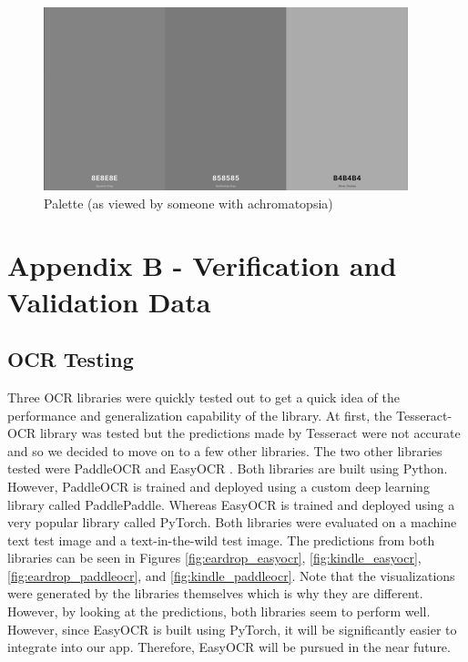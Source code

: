 \documentclass[a4paper,11pt]{article}
\begin{document}
\begin{figure}[H]
\centering
\includegraphics[scale=0.45]{img/Palette_Greyscale.png}
\caption{Palette (as viewed by someone with achromatopsia)}
\label{fig:palette_greyscale}
\end{figure}

\newpage
\section{Appendix B - Verification and Validation Data}

\subsection{OCR Testing}
Three OCR libraries were quickly tested out to get a quick idea of the performance and generalization capability of the library. At first, the Tesseract-OCR library \cite{tesseract-github} was tested but the predictions made by Tesseract were not accurate and so we decided to move on to a few other libraries. The two other libraries tested were PaddleOCR \cite{paddle-ocr} and EasyOCR \cite{easy-ocr}. Both libraries are built using Python. However, PaddleOCR is trained and deployed using a custom deep learning library called PaddlePaddle. Whereas EasyOCR is trained and deployed using a very popular library called PyTorch. Both libraries were evaluated on a machine text test image and a text-in-the-wild test image. The predictions from both libraries can be seen in Figures \ref{fig:eardrop_easyocr}, \ref{fig:kindle_easyocr}, \ref{fig:eardrop_paddleocr}, and \ref{fig:kindle_paddleocr}. Note that the visualizations were generated by the libraries themselves which is why they are different. However, by looking at the predictions, both libraries seem to perform well. However, since EasyOCR is built using PyTorch, it will be significantly easier to integrate into our app. Therefore, EasyOCR will be pursued in the near future.
\end{document}
